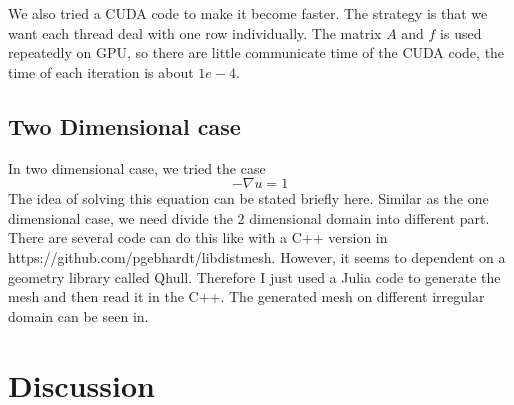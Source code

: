 \documentclass[11pt]{article}
\begin{document}
We also tried a CUDA code to make it become faster. The strategy is that we want each thread deal with one row individually. The matrix $A$ and $f$ is used repeatedly on GPU, so there are little communicate time of the CUDA code, the time of each iteration is about $1e-4$.


\subsection{Two Dimensional case}

In two dimensional case, we tried the case
\begin{equation}
    -\nabla u = 1 
\end{equation}
The idea of solving this equation can be stated briefly here.
Similar as the one dimensional case, we need divide the 2 dimensional domain into different part. There are several code can do this like \cite{persson2004simple} with a C++ version in https://github.com/pgebhardt/libdistmesh. However, it seems to dependent on a geometry library called Qhull. Therefore I just used a Julia code to generate the mesh and then read it in the C++. The generated mesh on different irregular domain can be seen in.
\section{Discussion}
\end{document}

